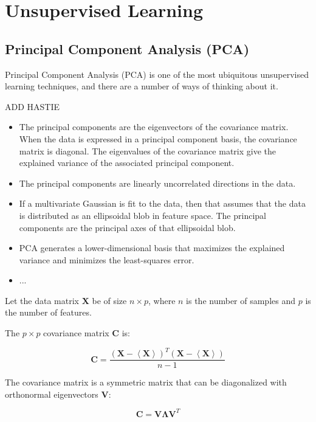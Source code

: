 \chapter{Unsupervised Learning}

\section{Principal Component Analysis (PCA)}

Principal Component Analysis (PCA) is one of the most ubiquitous unsupervised learning techniques, and there are a number of ways of thinking about it. 

ADD HASTIE 
\begin{itemize}
\item The principal components are the eigenvectors of the covariance matrix. When the data is expressed in a principal component basis, the covariance matrix is diagonal. The eigenvalues of the covariance matrix give the explained variance of the associated principal component. 
\item The principal components are linearly uncorrelated directions in the data.
\item If a multivariate Gaussian is fit to the data, then that assumes that the data is distributed as an ellipsoidal blob in feature space. The principal components are the principal axes of that ellipsoidal blob.
\item PCA generates a lower-dimensional basis that maximizes the explained variance and minimizes the least-squares error.
\item ...
\end{itemize}

Let the data matrix $\mathbf{X}$ be of size $n\times p$, where $n$ is the number of samples and $p$ is the number of features. 

The $p\times p$ covariance matrix $\mathbf{C}$ is:

\begin{equation}
\mathbf{C} = \frac{\left(\mathbf{X}-\left<\mathbf{X}\right>\right)^T\left(\mathbf{X}-\left< \mathbf{X}\right>\right)}{n-1}
\end{equation}

The covariance matrix is a symmetric matrix that can be diagonalized with orthonormal eigenvectors $\mathbf{V}$:

\begin{equation}
\mathbf{C} = \mathbf{V}\mathbf{\Lambda}\mathbf{V}^T
\end{equation}

